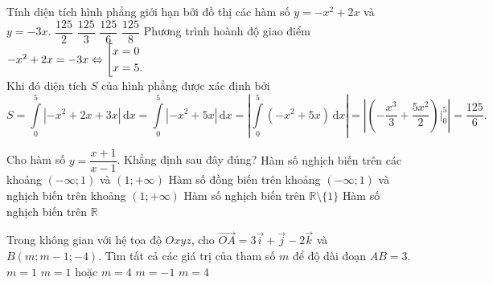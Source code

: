 \begin{ex}%
	Tính diện tích hình phẳng giới hạn bởi đồ thị các hàm số $y=-x^2+2x$ và $y=-3x$.
	\choice
	{$\dfrac{125}{2}$}
	{$\dfrac{125}{3}$}
	{\True $\dfrac{125}{6}$}
	{$\dfrac{125}{8}$}
	\loigiai
	{Phương trình hoành độ giao điểm $-x^2+2x=-3x\Leftrightarrow\left[\begin{aligned}&x=0\\&x=5.\end{aligned}\right.$\\
		 Khi đó diện tích $S$ của hình phẳng được xác định bởi
		$$S=\displaystyle\int \limits_0^5|-x^2+2x+3x|\mathrm{\, d}x=\displaystyle\int\limits_0^5|-x^2+5x|\mathrm{\, d}x=\left| \displaystyle\int\limits_0^5(-x^2+5x)\mathrm{\, d}x\right| 
		=\left| \left(-\dfrac{x^3}{3}+\dfrac{5x^2}{2}\right)\Big| _0^5\right| =\dfrac{125}{6}.$$
	}
\end{ex}
\begin{ex}%
	 Cho hàm số $y=\dfrac{x+1}{x-1}$. Khẳng định sau đây đúng?
	\choice
	{\True Hàm số nghịch biến trên các khoảng $\left(-\infty; 1 \right) $ và $\left(1; +\infty \right) $}
	{Hàm số đồng  biến trên khoảng $\left(-\infty; 1 \right) $ và nghịch biến trên khoảng  $\left(1; +\infty \right) $ }
	{Hàm số nghịch biến trên $\mathbb{R}\setminus \{1\}$}
	{Hàm số nghịch biến trên $\mathbb{R}$}
\end{ex}

\begin{ex}%
	 Trong không gian với hệ tọa độ $Oxyz$, cho $\overrightarrow{OA}=3\overrightarrow{i}+\overrightarrow{j}-2\overrightarrow{k} $ và $B(m;m-1;-4)$. Tìm tất cả các giá trị của tham số $m$ để độ dài đoạn $AB=3$.
	\choice
	{$m=1$}
	{\True $m=1$ hoặc $m=4$}
	{$m=-1$}
	{$m=4$}
\end{ex}

